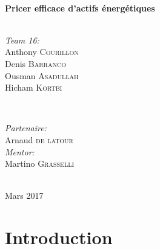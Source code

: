 \documentclass[12pt]{report}
\begin{document}
\begin{titlepage}
\center %



\HRule \\[0.4cm]
{ \huge \bfseries Pricer efficace d'actifs énergétiques}\\[0.4cm] %
\HRule \\[1.5cm]


\begin{minipage}{0.4\textwidth}
	\begin{flushleft} \large
		\emph{Team 16:}\\
		Anthony \textsc{Courillon} %
		\\
		Denis \textsc{Barranco}
		\\
		Ousman \textsc{Asadullah}
		\\
		Hicham \textsc{Kortbi} %
	\end{flushleft}
\end{minipage}
~
\begin{minipage}{0.4\textwidth}
	\begin{flushright} \large
		\emph{Partenaire:} \\
		Arnaud \textsc{de latour} %
		\\
		\emph{Mentor:} \\
		Martino \textsc{Grasselli} %
	\end{flushright}
\end{minipage}\\[2cm]


{\large Mars 2017}\\[2cm] %

\end{titlepage}


\chapter*{Introduction}
\end{document}
